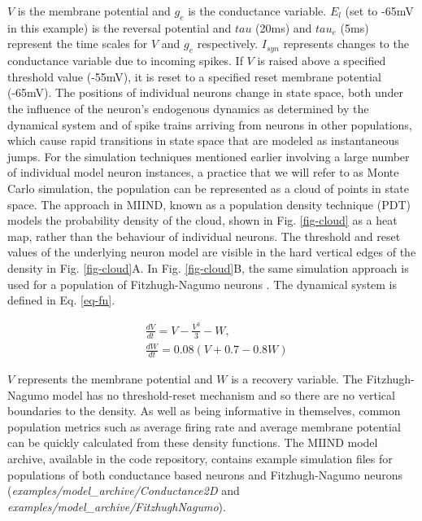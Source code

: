 \documentclass[utf8]{frontiersSCNS} %
\begin{document}
$V$ is the membrane potential and $g_e$ is the conductance variable. $E_l$ (set to -65mV in this example) is the reversal potential and $tau$ (20ms) and $tau_e$ (5ms) represent the time scales for $V$ and $g_e$ respectively. $I_{syn}$ represents changes to the conductance variable due to incoming spikes. If $V$ is raised above a specified threshold value (-55mV), it is reset to a specified reset membrane potential (-65mV).
The positions of individual neurons change in state space, both under the influence of the neuron's endogenous dynamics as determined by the dynamical system and of spike trains arriving from neurons in other populations, which cause rapid transitions in state space that are modeled as instantaneous jumps. For the simulation techniques mentioned earlier involving a large number of individual model neuron instances, a practice that we will refer to as Monte Carlo simulation, the population can be represented as a cloud of points in state space. The approach in MIIND, known as a population density technique (PDT) models the probability density of the cloud, shown in Fig. \ref{fig-cloud} as a heat map, rather than the behaviour of individual neurons. The threshold and reset values of the underlying neuron model are visible in the hard vertical edges of the density in Fig. \ref{fig-cloud}A. In Fig. \ref{fig-cloud}B, the same simulation approach is used for a population of Fitzhugh-Nagumo neurons \citep{fitzhugh1961impulses,nagumo1962active}. The dynamical system is defined in Eq. \ref{eq-fn}. 

\begin{equation}
\begin{aligned}
&\frac{dV}{dt} = V - \frac{V^3}{3} - W, \\
&\frac{dW}{dt} = 0.08(V + 0.7 - 0.8W)
\label{eq-fn}
\end{aligned}
\end{equation}

$V$ represents the membrane potential and $W$ is a recovery variable. The Fitzhugh-Nagumo model has no threshold-reset mechanism and so there are no vertical boundaries to the density. As well as being informative in themselves, common population metrics such as average firing rate and average membrane potential can be quickly calculated from these density functions. The MIIND model archive, available in the code repository, contains example simulation files for populations of both conductance based neurons and Fitzhugh-Nagumo neurons (\textit{examples/model\_archive/Conductance2D} and \textit{examples/model\_archive/FitzhughNagumo}).
\end{document}
